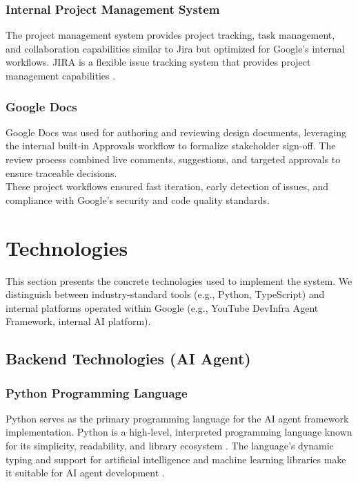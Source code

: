 \begin{spacing}{1.2}
\subsubsection{Internal Project Management System}
The project management system provides project tracking, task management, and collaboration capabilities similar to Jira but optimized for Google's internal workflows. JIRA is a flexible issue tracking system that provides project management capabilities \cite{jira2002}.


\subsubsection{Google Docs}
Google Docs was used for authoring and reviewing design documents, leveraging the internal built-in Approvals workflow to formalize stakeholder sign-off. The review process combined live comments, suggestions, and targeted approvals to ensure traceable decisions.\\


These project workflows ensured fast iteration, early detection of issues, and compliance with Google's security and code quality standards.



\section{Technologies}

This section presents the concrete technologies used to implement the system. We distinguish between industry-standard tools (e.g., Python, TypeScript) and internal platforms operated within Google (e.g., YouTube DevInfra Agent Framework, internal AI platform).

\subsection{Backend Technologies (AI Agent)}

\subsubsection{Python Programming Language}
Python serves as the primary programming language for the AI agent framework implementation. Python is a high-level, interpreted programming language known for its simplicity, readability, and library ecosystem \cite{van1995python}. The language's dynamic typing and support for artificial intelligence and machine learning libraries make it suitable for AI agent development \cite{pedregosa2011scikit}.




\end{spacing}
